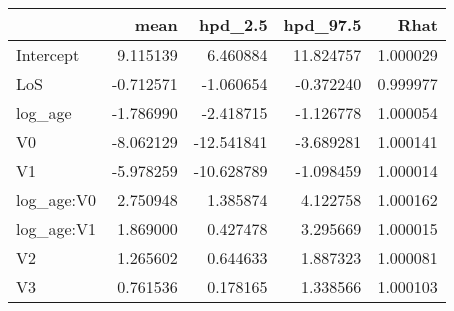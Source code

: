 \begin{tabular}{lrrrr}
\hline
\hline
{} &      mean &    hpd\_2.5 &   hpd\_97.5 &      Rhat \\
\hline
Intercept  &  9.115139 &   6.460884 &  11.824757 &  1.000029 \\
LoS        & -0.712571 &  -1.060654 &  -0.372240 &  0.999977 \\
log\_age    & -1.786990 &  -2.418715 &  -1.126778 &  1.000054 \\
V0         & -8.062129 & -12.541841 &  -3.689281 &  1.000141 \\
V1         & -5.978259 & -10.628789 &  -1.098459 &  1.000014 \\
log\_age:V0 &  2.750948 &   1.385874 &   4.122758 &  1.000162 \\
log\_age:V1 &  1.869000 &   0.427478 &   3.295669 &  1.000015 \\
V2         &  1.265602 &   0.644633 &   1.887323 &  1.000081 \\
V3         &  0.761536 &   0.178165 &   1.338566 &  1.000103 \\
\hline
\hline
\end{tabular}
